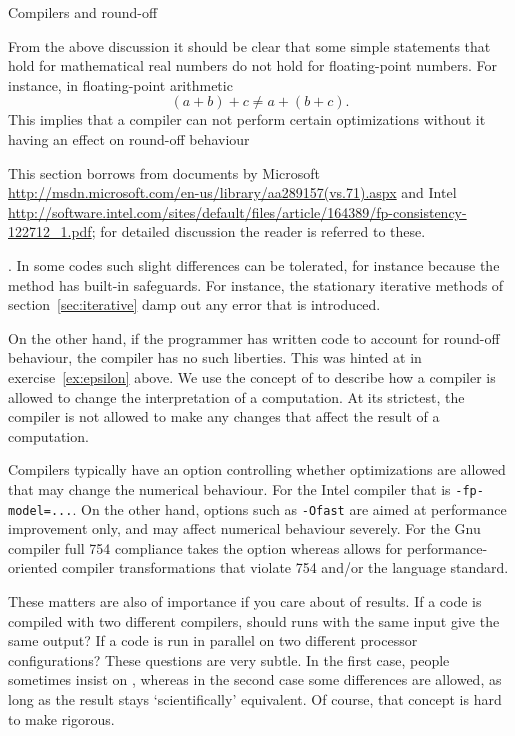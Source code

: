 
 {Compilers and round-off}
\label{sec:round-compile}

From the above discussion it should be clear that some simple statements
that hold for mathematical real numbers do not hold for floating-point numbers.
For instance, in floating-point arithmetic 
\[ (a+b)+c\not=a+(b+c).\]
This implies that a compiler can not perform certain optimizations
without it having an effect on round-off behaviour
\begin{footnoteenv}
  {This
section borrows from documents by
Microsoft \url{http://msdn.microsoft.com/en-us/library/aa289157(vs.71).aspx}
and
Intel \url{http://software.intel.com/sites/default/files/article/164389/fp-consistency-122712_1.pdf};
for detailed discussion the reader is referred to these.}
\end{footnoteenv}
.  In some
codes such slight differences can be tolerated, for instance because
the method has built-in safeguards. For instance, the stationary
iterative methods of section~\ref{sec:iterative} damp out any error
that is introduced. 

On the other hand, if the programmer has written code to account for
round-off behaviour, the compiler has no such liberties. This was
hinted at in exercise~\ref{ex:epsilon} above.
We use the concept of  to describe
how a compiler is allowed to change the interpretation of a computation.
At its strictest, the compiler is not allowed
to make any changes that affect the result of a
computation.

Compilers typically have an option controlling whether optimizations
are allowed that may change the numerical behaviour. For the Intel
compiler that is \texttt{-fp-model=...}. On the other hand, options
such as \texttt{-Ofast} are aimed at performance improvement only, and
may affect numerical behaviour severely.  For the Gnu compiler full
754 compliance takes the option  whereas
 allows for performance-oriented compiler
transformations that violate 754 and/or the language standard.

These matters are also of importance if you care about
 of results. If a code is compiled with 
two different compilers, should runs with the same input give
the same output? If a code is run in parallel on two different 
processor configurations? These questions are very subtle.
In the first case, people sometimes insist on 
, whereas
in the second case some differences are allowed, as long
as the result stays `scientifically' equivalent. Of course,
that concept is hard to make rigorous.

